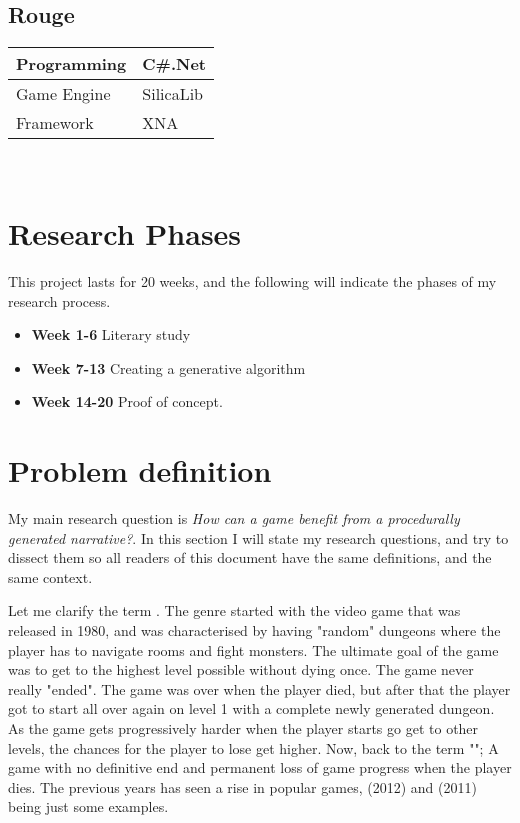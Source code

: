 \subsection{Rouge}
	\begin{tabular}{|l|l|}
		\hline
		Programming & C\#.Net\\
		\hline
		Game Engine & SilicaLib\\
		\hline
		Framework & XNA\\
		\hline
	\end{tabular}
\\
\section{Research Phases}
This project lasts for 20 weeks, and the following will indicate the phases of my research process.

\begin{itemize}
	\item \textbf{Week 1-6} Literary study
	\item \textbf{Week 7-13} Creating a generative algorithm
	\item \textbf{Week 14-20} Proof of concept.
\end{itemize}

\section{Problem definition}
My main research question is \textit{How can a \rogue game benefit from a procedurally generated narrative?}. In this section I will state my research questions, and try to dissect them so all readers of this document have the same definitions, and the same context.
	
Let me clarify the term \rogue. The genre started with the video game  that was released in 1980, and was characterised by having "random" dungeons where the player has to navigate rooms and fight monsters. The ultimate goal of the game was to get to the highest level possible without dying once. The game never really "ended". The game was over when the player died, but after that the player got to start all over again on level 1 with a complete newly generated dungeon. As the game gets progressively harder when the player starts go get to other levels, the chances for the player to lose get higher. Now, back to the term "\rogue"; A game with no definitive end and permanent loss of game progress when the player dies. The previous years has seen a rise in popular \rogue games,  (2012) and  (2011) being just some examples.

